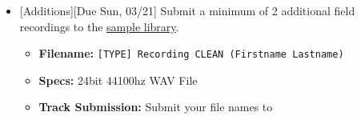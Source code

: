 \def\dMon{Mon, 03/15}
\def\dTues{Tues, 03/16}
\def\dWed{Wed, 03/17}
\def\dThur{Thur, 03/18}
\def\dFri{Fri, 03/19}
\def\dSat{Sat, 03/20}
\def\dSun{Sun, 03/21}
\placeDate

\begin{itemize}[noitemsep,topsep=0pt,leftmargin=*]
	\item {}[Additions][Due \dSun] \newline
	      Submit a minimum of 2 additional field recordings to the \href{\samplelibPermURL}{sample library}.
	      \begin{itemize}
		      \item \textbf{Filename:} \texttt{[TYPE] Recording CLEAN (Firstname Lastname)}
		      \item \textbf{Specs:} 24bit 44100hz WAV File
		      \item \textbf{Track Submission:} Submit your file names to \discordS
	      \end{itemize}
\end{itemize}